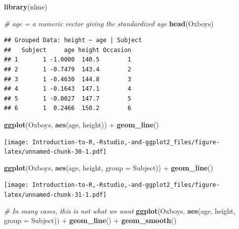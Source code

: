 \documentclass[]{book}
\newenvironment{Shaded}{\begin{snugshade}}{\end{snugshade}}
\newcommand{\KeywordTok}[1]{\textcolor[rgb]{0.13,0.29,0.53}{\textbf{{#1}}}}
\newcommand{\DataTypeTok}[1]{\textcolor[rgb]{0.13,0.29,0.53}{{#1}}}
\newcommand{\StringTok}[1]{\textcolor[rgb]{0.31,0.60,0.02}{{#1}}}
\newcommand{\CommentTok}[1]{\textcolor[rgb]{0.56,0.35,0.01}{\textit{{#1}}}}
\newcommand{\NormalTok}[1]{{#1}}
\begin{document}
\begin{Shaded}
\begin{Highlighting}[]
\KeywordTok{library}\NormalTok{(nlme)}
\end{Highlighting}
\end{Shaded}

\begin{Shaded}
\begin{Highlighting}[]
\CommentTok{# age = a numeric vector giving the standardized age }
\KeywordTok{head}\NormalTok{(Oxboys)}
\end{Highlighting}
\end{Shaded}

\begin{verbatim}
## Grouped Data: height ~ age | Subject
##   Subject     age height Occasion
## 1       1 -1.0000  140.5        1
## 2       1 -0.7479  143.4        2
## 3       1 -0.4630  144.8        3
## 4       1 -0.1643  147.1        4
## 5       1 -0.0027  147.7        5
## 6       1  0.2466  150.2        6
\end{verbatim}

\begin{Shaded}
\begin{Highlighting}[]
\KeywordTok{ggplot}\NormalTok{(Oxboys, }\KeywordTok{aes}\NormalTok{(age, height)) +}\StringTok{ }\KeywordTok{geom_line}\NormalTok{()}
\end{Highlighting}
\end{Shaded}

\texttt{[image: Introduction-to-R,-Rstudio,-and-ggplot2\_files/figure-latex/unnamed-chunk-30-1.pdf]}

\begin{Shaded}
\begin{Highlighting}[]
\KeywordTok{ggplot}\NormalTok{(Oxboys, }\KeywordTok{aes}\NormalTok{(age, height, }\DataTypeTok{group =} \NormalTok{Subject)) +}\StringTok{ }\KeywordTok{geom_line}\NormalTok{()}
\end{Highlighting}
\end{Shaded}

\texttt{[image: Introduction-to-R,-Rstudio,-and-ggplot2\_files/figure-latex/unnamed-chunk-31-1.pdf]}

\begin{Shaded}
\begin{Highlighting}[]
\CommentTok{# In many cases, this is not what we want}
\KeywordTok{ggplot}\NormalTok{(Oxboys, }\KeywordTok{aes}\NormalTok{(age, height, }\DataTypeTok{group =} \NormalTok{Subject)) +}\StringTok{ }\KeywordTok{geom_line}\NormalTok{() +}\StringTok{ }\KeywordTok{geom_smooth}\NormalTok{()}
\end{Highlighting}
\end{Shaded}
\end{document}
